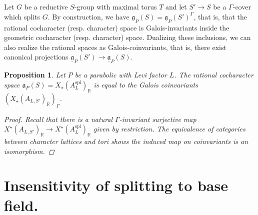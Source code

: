 \documentclass[openany]{amsbook}
\newtheorem{proposition}[theorem]{Proposition}
\theoremstyle{definition}
\theoremstyle{remark}
\numberwithin{equation}{section}
\newcommand{\R}{\mathbb{R}}
\newcommand{\ul}[1]{\underline{#1}}
\renewcommand{\-}{\operatorname{-}}
\renewcommand{\a}{\mathfrak{a}}
\newcommand{\spl}{\mathrm{spl}}
\begin{document}
Let $G$ be a reductive $S$-group with maximal torus $T$ and let $S' \to S$ be a $\Gamma$-cover which splits $G$. By construction, we have $\ul{\a}_P(S) = \ul{\a}_P(S')^{\Gamma}$, that is, that the rational cocharacter (resp. character) space is Galois-invariants inside the geometric cocharacter (resp. character) space. Dualizing these inclusions, we can also realize the rational spaces as Galois-coinvariants, that is, there exist canonical projections $\ul{\a}_P(S') \to \ul{\a}_P(S)$.

\begin{proposition}
    Let $P$ be a parabolic with Levi factor $L$. The rational cocharacter space $\a_P(S) = X_\star(A_L^{\spl})_{\R}$ is equal to the Galois coinvariants $(X_\star(A_{L,S'})_{\R})_{\Gamma}$.
    \begin{proof}
        Recall that there is a natural $\Gamma$-invariant surjective map $X^\star(A_{L,S'})_{\R} \to X^\star(A_L^{\spl})_{\R}$ given by restriction. The equivalence of categories between character lattices and tori shows the induced map on coinvariants is an isomorphism. 
    \end{proof}
\end{proposition}


\section{Insensitivity of splitting to base field.}
\end{document}
